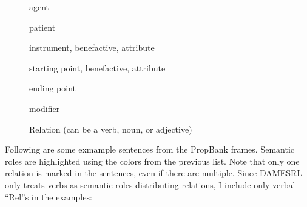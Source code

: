 \begin{description}
  \item[] agent
  \item[] patient
  \item[] instrument, benefactive, attribute
  \item[] starting point, benefactive, attribute
  \item[] ending point
  \item[] modifier
  \item[] Relation (can be a verb, noun, or adjective)
\end{description}

Following are some exmample sentences from the PropBank frames. Semantic roles are
highlighted using the colors from the previous list. Note that only one relation is marked in the
sentences, even if there are multiple. Since DAMESRL only treats verbs as semantic roles distributing
relations, I include only verbal ``Rel''s in the examples:

